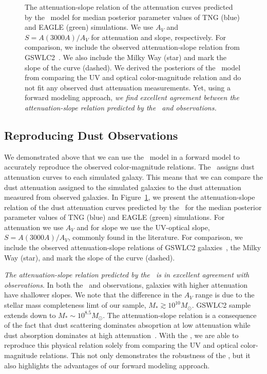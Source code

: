 \begin{figure}
\begin{center}
    \caption{\label{fig:slope}
    The attenuation-slope relation of the attenuation curves predicted by the
    \eda~model for median posterior parameter values of TNG (blue) and EAGLE
    (green) simulations. We use $A_V$ and $S = A(3000A)/A_V$ for attenuation
    and slope, respectively. For comparison, we include the observed 
    attenuation-slope relation from GSWLC2~\citep{salim2020}. We also include 
    the Milky Way (star) and mark the slope of the \cite{calzetti2001} curve
    (dashed). We derived the posteriors of the \eda~model from comparing the
    UV and optical color-magnitude relation and do not fit any observed dust
    attenuation measurements. Yet, using a forward modeling approach, \emph{we find 
    excellent agreement between the attenuation-slope relation predicted by
    the \eda~and observations.}
    }
\end{center}
\end{figure}

\subsection{Reproducing Dust Observations} 
We demonstrated above that we can use the \eda~model in a forward model to
accurately reproduce the observed color-magnitude relations. The \eda~assigns dust attenuation curves to each simulated galaxy. This
means that we can compare the dust attenuation assigned to the simulated
galaxies to the dust attenuation measured from 
observed galaxies. In Figure~\ref{fig:slope}, we present the attenuation-slope 
relation of the dust attenuation curves predicted by the \eda~for the median posterior parameter 
values of TNG (blue) and EAGLE (green) simulations. For attenuation we use
$A_V$ and for slope we use the UV-optical slope, $S = A(3000A)/A_V$, commonly
found in the literature. For comparison, we include the observed
attenuation-slope relations of GSWLC2 galaxies~\citep[grey;][]{salim2020}, the
Milky Way (star), and mark the slope of the \cite{calzetti2001} curve (dashed). 

\emph{The attenuation-slope relation predicted by the \eda~is in excellent 
agreement with observations}. In both the \eda~and observations, galaxies with 
higher attenuation have shallower slopes. We note that the difference in the
$A_V$ range is due to the stellar mass completeness limt of our sample, $M_* \gtrsim 
10^{10} M_\odot$. \cite{salim2020} GSWLC2 sample extends down to $M_* \sim 10^{8.5}M_\odot$. 
The attenuation-slope relation is a consequence of the fact that dust scattering 
dominates absoprtion at low attenuation while dust absorption dominates at high 
attenuation~\citep{gordon1994, witt2000, draine2003, chevallard2013}. With the
\eda, we are able to reproduce this physical relation solely from comparing the
UV and optical color-magnitude relations. This not only demonstrates the
robustness of the \eda, but it also highlights the advantages of 
our forward modeling approach. 

